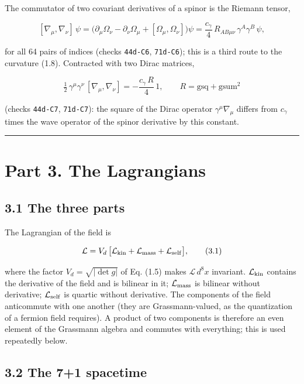 \documentclass[
  10pt,
]{article}
\begin{document}
The commutator of two covariant derivatives of a spinor is the Riemann
tensor,

\[[\nabla_\mu,\nabla_\nu]\,\psi=\big(\partial_\mu\Omega_\nu-\partial_\nu\Omega_\mu+[\Omega_\mu,\Omega_\nu]\big)\psi
=\frac{c_\gamma}{4}\,R_{AB\mu\nu}\,\gamma^A\gamma^B\,\psi,\tag{2.9}\]

for all 64 pairs of indices (checks \texttt{44d-C6}, \texttt{71d-C6});
this is a third route to the curvature (1.8). Contracted with two Dirac
matrices,

\[\tfrac12\,\gamma^\mu\gamma^\nu\,[\nabla_\mu,\nabla_\nu]=-\frac{c_\gamma\,R}{4}\,1,\qquad
R=\mathrm{gsq}+\mathrm{gsum}^2\tag{2.10}\]

(checks \texttt{44d-C7}, \texttt{71d-C7}): the square of the Dirac
operator \(\gamma^\mu\nabla_\mu\) differs from \(c_\gamma\) times the
wave operator of the spinor derivative by this constant.

\begin{center}\rule{0.5\linewidth}{0.5pt}\end{center}

\hypertarget{part-3.-the-lagrangians}{%
\section{Part 3. The Lagrangians}\label{part-3.-the-lagrangians}}

\hypertarget{the-three-parts}{%
\subsection{3.1 The three parts}\label{the-three-parts}}

The Lagrangian of the field is

\[\mathcal L=V_d\,\big[\mathcal L_{\rm kin}+\mathcal L_{\rm mass}+\mathcal L_{\rm self}\big],\tag{3.1}\]

where the factor \(V_d=\sqrt{|\det g|}\) of Eq. (1.5) makes
\(\mathcal L\,d^8x\) invariant. \(\mathcal L_{\rm kin}\) contains the
derivative of the field and is bilinear in it; \(\mathcal L_{\rm mass}\)
is bilinear without derivative; \(\mathcal L_{\rm self}\) is quartic
without derivative. The components of the field anticommute with one
another (they are Grassmann-valued, as the quantization of a fermion
field requires). A product of two components is therefore an even
element of the Grassmann algebra and commutes with everything; this is
used repeatedly below.

\hypertarget{the-71-spacetime}{%
\subsection{3.2 The 7+1 spacetime}\label{the-71-spacetime}}
\end{document}
